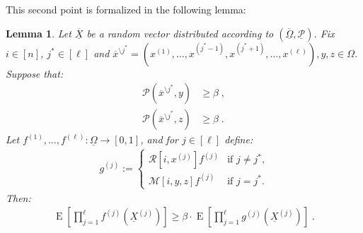 \documentclass{daj}
\newcommand{\1}{\mathbbm{1}}
\theoremstyle{plain}
\newtheorem{lemma}[theorem]{Lemma}
\theoremstyle{definition}
\DeclareMathOperator*{\EE}{E}
\newcommand{\cM}{\mathcal{M}}
\newcommand{\cP}{\mathcal{P}}
\newcommand{\cR}{\mathcal{R}}
\begin{document}
This second point is formalized in the following lemma:
\begin{lemma}\label{lem:maximumKeepsProbability}
  Let $\overline{\underline{X}}$ be a random vector distributed according to
  $(\overline{\underline{\Omega}}, \underline{\mathcal{P}})$.  Fix $i \in [n]$,
  $j^* \in [\ell]$
  and
  $\overline{x}^{\setminus j^*} = (x^{(1)},\ldots,x^{(j^*-1)},
  x^{(j^*+1)},\ldots,x^{(\ell)}), y, z \in \Omega$.  Suppose that:
\begin{align}
\cP(\overline{x}^{\setminus j^*},y) &\ge \beta \;,
\label{eq:845a}\\
\cP(\overline{x}^{\setminus j^*},z) &\ge \beta
\label{eq:846a}\;.
\end{align}
Let $f^{(1)},\ldots,f^{(\ell)}: \underline{\Omega} \to [0,1]$, and
for $j \in [\ell]$ define:
\begin{align}
g^{(j)} := 
\begin{cases}
\cR[i,x^{(j)}]f^{(j)} & \text{if $j \neq j^*$,}\\
\cM[i,y,z]f^{(j)} & \text{if $j = j^*$.}
\end{cases}
\end{align}
Then:
\begin{align}\label{eq:6a}
\EE\left[\prod_{j=1}^{\ell} f^{(j)}(\underline{X}^{(j)})\right]
\geq
\beta \cdot \EE\left[\prod_{j=1}^{\ell} g^{(j)}(\underline{X}^{(j)})\right]\;.
\end{align}
\end{lemma}
\end{document}
